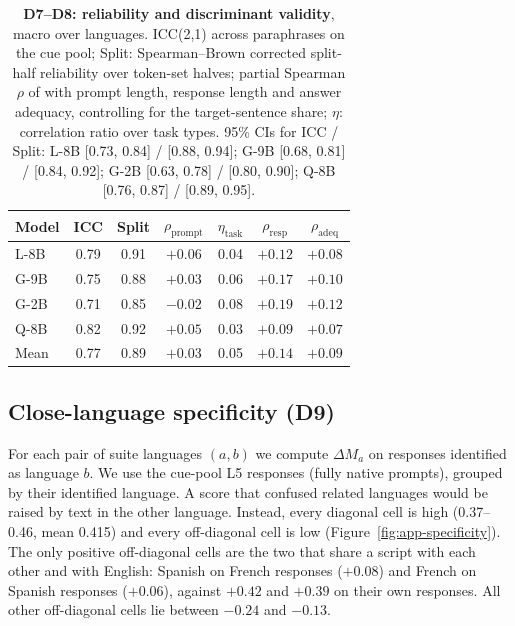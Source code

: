 \begin{table}[!htbp]
  \centering
  \footnotesize
  \setlength{\tabcolsep}{2.6pt}
  \begin{tabular}{@{}lcccccc@{}}
    \toprule
    \textbf{Model} & \textbf{ICC} & \textbf{Split} & \textbf{$\rho_{\text{prompt}}$} & \textbf{$\eta_{\text{task}}$} & \textbf{$\rho_{\text{resp}}$} & \textbf{$\rho_{\text{adeq}}$} \\
    \midrule
    L-8B & 0.79 & 0.91 & $+0.06$ & 0.04 & $+0.12$ & $+0.08$ \\
    G-9B & 0.75 & 0.88 & $+0.03$ & 0.06 & $+0.17$ & $+0.10$ \\
    G-2B & 0.71 & 0.85 & $-0.02$ & 0.08 & $+0.19$ & $+0.12$ \\
    Q-8B & 0.82 & 0.92 & $+0.05$ & 0.03 & $+0.09$ & $+0.07$ \\
    \midrule
    Mean & 0.77 & 0.89 & $+0.03$ & 0.05 & $+0.14$ & $+0.09$ \\
    \bottomrule
  \end{tabular}
  \caption{\textbf{D7--D8: reliability and discriminant validity}, macro over languages. ICC(2,1) across paraphrases on the cue pool; Split: Spearman--Brown corrected split-half reliability over token-set halves; partial Spearman $\rho$ of \dM with prompt length, response length and answer adequacy, controlling for the target-sentence share; $\eta$: correlation ratio over task types. 95\% CIs for ICC / Split: L-8B [0.73, 0.84] / [0.88, 0.94]; G-9B [0.68, 0.81] / [0.84, 0.92]; G-2B [0.63, 0.78] / [0.80, 0.90]; Q-8B [0.76, 0.87] / [0.89, 0.95].}
  \label{tab:app-reliability}
\end{table}

\FloatBarrier
\subsection{Close-language specificity (D9)}

For each pair of suite languages $(a,b)$ we compute $\Delta M_a$ on responses identified as language $b$. We use the cue-pool L5 responses (fully native prompts), grouped by their identified language. A score that confused related languages would be raised by text in the other language. Instead, every diagonal cell is high (0.37--0.46, mean 0.415) and every off-diagonal cell is low (Figure~\ref{fig:app-specificity}). The only positive off-diagonal cells are the two that share a script with each other and with English: Spanish \dM on French responses ($+0.08$) and French \dM on Spanish responses ($+0.06$), against $+0.42$ and $+0.39$ on their own responses. All other off-diagonal cells lie between $-0.24$ and $-0.13$.


